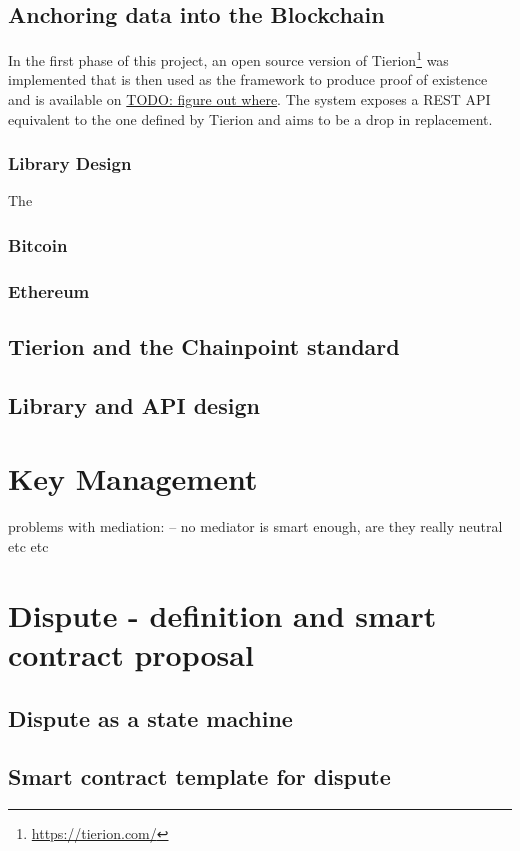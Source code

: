 \documentclass[12pt,msc,a4paper,oneside]{ucl_thesis}
\begin{document}
\section{Anchoring data into the Blockchain} \label{sec:disclosure_anchor_data}
In the first phase of this project, an open source version of Tierion\footnote{\url{https://tierion.com/}} was implemented that is then used as the framework to produce proof of existence and is available on \url{TODO: figure out where}. The system exposes a REST API equivalent to the one defined by Tierion and aims to be a drop in replacement.

\subsection{Library Design}
The 

\subsection{Bitcoin}
\subsection{Ethereum}
\section{Tierion and the Chainpoint standard}
\section{Library and API design}

\chapter{Key Management} \label{chapter:key_management}
problems with mediation: -- no mediator is smart enough, are they really neutral etc etc

\chapter{Dispute - definition and smart contract proposal}

\section{Dispute as a state machine}
\section{Smart contract template for dispute}
\end{document}
